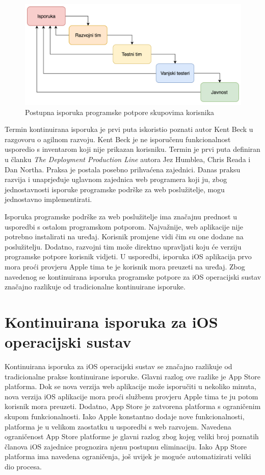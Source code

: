\documentclass[times, utf8, diplomski, numeric]{fer}
\begin{document}
\begin{figure}[h]
\centering
\includegraphics[scale=0.6]{DeploymentStages}
\caption{Postupna isporuka programske potpore skupovima korisnika}
\label{fig:DeploymentStages}
\end{figure}

Termin kontinuirana isporuka je prvi puta iskoristio poznati autor Kent Beck u razgovoru o agilnom razvoju. Kent Beck je ne isporučenu funkcionalnost usporedio s inventarom koji nije prikazan korisniku. Termin je prvi puta definiran u članku \textit{The Deployment Production Line} autora Jez Humblea, Chris Reada i Dan Northa. Praksa je postala posebno prihvaćena zajednici. Danas praksu razvija i unaprjeđuje uglavnom zajednica web programera koji ju, zbog jednostavnosti isporuke programske podrške za web poslužitelje, mogu jednostavno implementirati.

Isporuka programske podrške za web poslužitelje ima značajnu prednost u usporedbi s ostalom programskom potporom. Najvažnije, web aplikacije nije potrebno instalirati na uređaj. Korisnik promjene vidi čim su one dodane na poslužitelju. Dodatno, razvojni tim može direktno upravljati koju će verziju programske potpore korisnik vidjeti. U usporedbi, isporuka iOS aplikacija prvo mora proći provjeru Apple tima te je korisnik mora preuzeti na uređaj. Zbog navedenog se kontinuirana isporuka programske potpore za iOS operacijski sustav značajno razlikuje od tradicionalne kontinuirane isporuke.


\section{Kontinuirana isporuka za iOS operacijski sustav}

Kontinuirana isporuka za iOS operacijski sustav se značajno razlikuje od tradicionalne prakse kontinuirane isporuke. Glavni razlog ove razlike je App Store platforma. Dok se nova verzija web aplikacije može isporučiti u nekoliko minuta, nova verzija iOS aplikacije mora proći službenu provjeru Apple tima te ju potom korisnik mora preuzeti. Dodatno, App Store je zatvorena platforma s ograničenim skupom funkcionalnosti. Iako Apple konstantno dodaje nove funkcionalnosti, platforma je u velikom zaostatku u usporedbi s web razvojem. Navedena ograničenost App Store platforme je glavni razlog zbog kojeg veliki broj poznatih članova iOS zajednice prognozira njenu postupnu eliminaciju. Iako App Store platforma ima navedena ograničenja, još uvijek je moguće automatizirati veliki dio procesa.
\end{document}
